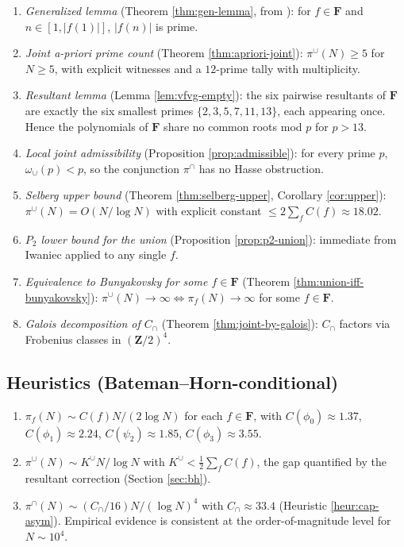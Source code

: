 \documentclass[11pt]{article}
\theoremstyle{definition}
\newcommand{\Z}{\mathbf{Z}}
\newcommand{\F}{\mathbf{F}}
\newcommand{\F}{\mathcal{F}}
\begin{document}
\begin{enumerate}
\item[(T1)] \emph{Generalized lemma} (Theorem \ref{thm:gen-lemma}, from \cite{B8}): for $f\in\F$ and $n\in[1,|f(1)|]$, $|f(n)|$ is prime.
\item[(T2)] \emph{Joint a-priori prime count} (Theorem \ref{thm:apriori-joint}): $\pi^\cup(N)\ge 5$ for $N\ge 5$, with explicit witnesses and a $12$-prime tally with multiplicity.
\item[(T3)] \emph{Resultant lemma} (Lemma \ref{lem:vfvg-empty}): the six pairwise resultants of $\F$ are exactly the six smallest primes $\{2,3,5,7,11,13\}$, each appearing once. Hence the polynomials of $\F$ share no common roots mod $p$ for $p>13$.
\item[(T4)] \emph{Local joint admissibility} (Proposition \ref{prop:admissible}): for every prime $p$, $\omega_\cup(p)<p$, so the conjunction $\pi^\cap$ has no Hasse obstruction.
\item[(T5)] \emph{Selberg upper bound} (Theorem \ref{thm:selberg-upper}, Corollary \ref{cor:upper}): $\pi^\cup(N)=O(N/\log N)$ with explicit constant $\le 2\sum_f C(f)\approx 18.02$.
\item[(T6)] \emph{$P_2$ lower bound for the union} (Proposition \ref{prop:p2-union}): immediate from Iwaniec applied to any single $f$.
\item[(T7)] \emph{Equivalence to Bunyakovsky for some $f\in\F$} (Theorem \ref{thm:union-iff-bunyakovsky}): $\pi^\cup(N)\to\infty\iff\pi_f(N)\to\infty$ for some $f\in\F$.
\item[(T8)] \emph{Galois decomposition of $C_\cap$} (Theorem \ref{thm:joint-by-galois}): $C_\cap$ factors via Frobenius classes in $(\Z/2)^4$.
\end{enumerate}

\subsection{Heuristics (Bateman--Horn-conditional)}

\begin{enumerate}
\item[(H1)] $\pi_f(N)\sim C(f)N/(2\log N)$ for each $f\in\F$, with $C(\phi_0)\approx 1.37$, $C(\phi_1)\approx 2.24$, $C(\psi_2)\approx 1.85$, $C(\phi_3)\approx 3.55$.
\item[(H2)] $\pi^\cup(N)\sim K^\cup N/\log N$ with $K^\cup<\frac12\sum_f C(f)$, the gap quantified by the resultant correction (Section \ref{sec:bh}).
\item[(H3)] $\pi^\cap(N)\sim (C_\cap/16) N/(\log N)^4$ with $C_\cap\approx 33.4$ (Heuristic \ref{heur:cap-asym}). Empirical evidence is consistent at the order-of-magnitude level for $N\sim 10^4$.
\end{enumerate}
\end{document}
